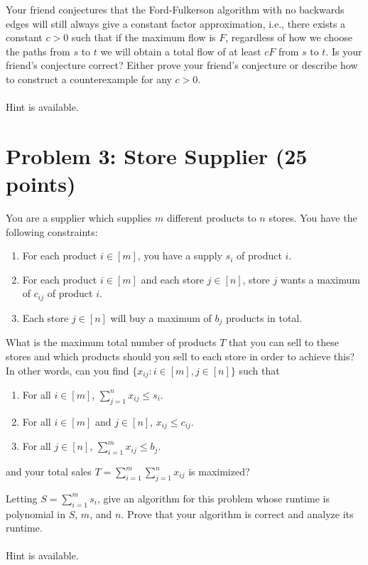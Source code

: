 \documentclass[12pt]{article}
\begin{document}
Your friend conjectures that the Ford-Fulkerson algorithm with no backwards edges
will still always give a constant factor approximation, i.e., there exists a
constant $c > 0$ such that if the maximum flow is $F$, regardless of how we choose
the paths from $s$ to $t$ we will obtain a total flow of at least $cF$ from $s$ to
$t$. Is your friend's conjecture correct? Either prove your friend's conjecture or
describe how to construct a counterexample for any $c > 0$.\\
\\
Hint is available.

\section*{Problem 3: Store Supplier (25 points)}
You are a supplier which supplies $m$ different products to $n$ stores. You have the following constraints:
\begin{enumerate}
\item For each product $i \in [m]$, you have a supply $s_i$ of product $i$.
\item For each product $i \in [m]$ and each store $j \in [n]$, store $j$ wants a maximum of $c_{ij}$ of product $i$.
\item Each store $j \in [n]$ will buy a maximum of $b_j$ products in total.
\end{enumerate}
What is the maximum total number of products $T$ that you can sell to these stores and which products should you sell to each store in order to achieve this? In other words, can you find $\{x_{ij}: i \in [m], j \in [n]\}$ such that 
\begin{enumerate}
\item For all $i \in [m]$, $\sum_{j=1}^{n}{x_{ij}} \leq s_i$.
\item For all $i \in [m]$ and $j \in [n]$, $x_{ij} \leq c_{ij}$.
\item For all $j \in [n]$, $\sum_{i=1}^{m}{x_{ij}} \leq b_j$.
\end{enumerate}
and your total sales $T = \sum_{i=1}^{m}{\sum_{j=1}^{n}{x_{ij}}}$ is maximized?

Letting $S = \sum_{i=1}^{m}{s_i}$, give an algorithm for this problem whose runtime is polynomial in $S$, $m$, and $n$. Prove that your algorithm is correct and analyze its runtime. \\
\\
Hint is available.
\vspace{5mm}
\newpage
\end{document}
